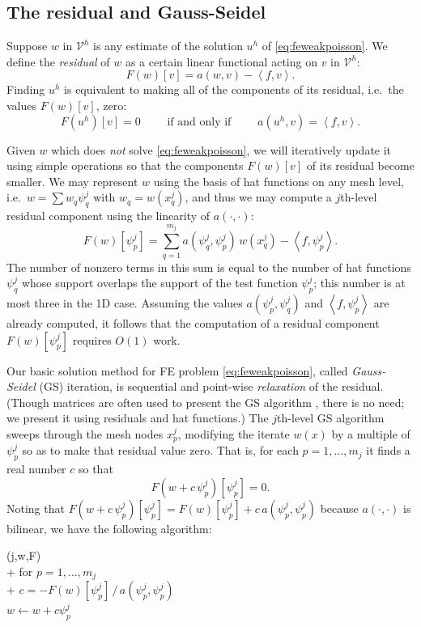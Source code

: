 \documentclass[letterpaper,final,12pt,reqno]{amsart}
\theoremstyle{claim}
\newcommand{\ip}[2]{\left<#1,#2\right>}
\numberwithin{equation}{section}
\numberwithin{figure}{section}
\numberwithin{table}{section}
\numberwithin{theorem}{section}
\begin{document}
\subsection*{The residual and Gauss-Seidel}  Suppose $w$ in $\mathcal{V}^h$ is any estimate of the solution $u^h$ of \eqref{eq:feweakpoisson}.  We define the \emph{residual} of $w$ as a certain linear functional acting on $v$ in $\mathcal{V}^h$:
\begin{equation}
  F(w)[v] = a(w,v) - \ip{f}{v}.  \label{eq:residual}
\end{equation}
Finding $u^h$ is equivalent to making all of the components of its residual, i.e.~the values $F(w)[v]$, zero:
\begin{equation}
  F(u^h)[v]=0 \qquad \text{ if and only if } \qquad a(u^h,v)=\ip{f}{v}. \label{eq:residualweakequivalence}
\end{equation}

Given $w$ which does \emph{not} solve \eqref{eq:feweakpoisson}, we will iteratively update it using simple operations so that the components $F(w)[v]$ of its residual become smaller.  We may represent $w$ using the basis of hat functions on any mesh level, i.e.~$w = \sum w_q \psi_q^j$ with $w_q = w(x_q^j)$, and thus we may compute a $j$th-level residual component using the linearity of $a(\cdot,\cdot)$:
\begin{equation}
  F(w)[\psi_p^j] = \sum_{q=1}^{m_j} a(\psi_q^j,\psi_p^j) \,w(x_q^j) - \ip{f}{\psi_p^j}.  \label{eq:residualpoisson}
\end{equation}
The number of nonzero terms in this sum is equal to the number of hat functions $\psi_q^j$ whose support overlaps the support of the test function $\psi_p^j$; this number is at most three in the 1D case.  Assuming the values $a(\psi_p^j,\psi_q^j)$ and $\ip{f}{\psi_p^j}$ are already computed, it follows that the computation of a residual component $F(w)[\psi_p^j]$ requires $O(1)$ work.

Our basic solution method for FE problem \eqref{eq:feweakpoisson}, called \emph{Gauss-Seidel} (GS) iteration, is sequential and point-wise \emph{relaxation} of the residual.  (Though matrices are often used to present the GS algorithm \cite[for example]{Bueler2021,Greenbaum1997}, there is no need; we present it using residuals and hat functions.)  The $j$th-level GS algorithm sweeps through the mesh nodes $x_p^j$, modifying the iterate $w(x)$ by a multiple of $\psi_p^j$ so as to make that residual value zero.  That is, for each $p=1,\dots,m_j$ it finds a real number $c$ so that
\begin{equation}
  F(w+c\,\psi_p^j)[\psi_p^j] = 0.  \label{eq:gaussseidelpoint}
\end{equation}
Noting that $F(w+c\,\psi_p^j)[\psi_p^j] = F(w)[\psi_p^j] + c\, a(\psi_p^j,\psi_p^j)$ because $a(\cdot,\cdot)$ is bilinear, we have the following algorithm:
\begin{pseudo*}
(j,w,F)\text{:} \\+
    for $p=1,\dots,m_j$ \\+
        $\displaystyle c = - F(w)[\psi_p^j]\, \big/ \,a(\psi_p^j,\psi_p^j)$  \\
        $w \gets w + c \psi_p^j$
\end{pseudo*}
\end{document}
